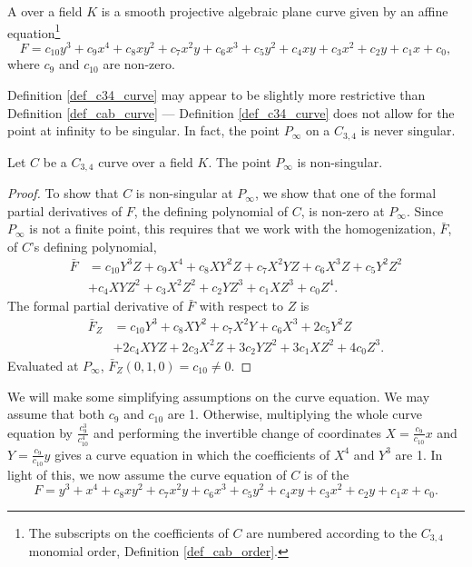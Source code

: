 \begin{definition}
  \label{def_c34_curve}
  A  over a field $K$
  is a smooth projective algebraic plane curve
  given by an affine equation\footnote{
  The subscripts on the coefficients of $C$ are numbered according to the $C_{3,4}$ monomial order,
  Definition \ref{def_cab_order}.}
  \[ F = c_{10}y^3 + c_9x^4 + c_8xy^2 + c_7x^2y + c_6x^3 + c_5y^2 + c_4xy + c_3x^2 + c_2y + c_1x + c_0, \]
  where $c_{9}$ and $c_{10}$ are non-zero.
\end{definition}

Definition \ref{def_c34_curve} may appear to be slightly more restrictive than Definition \ref{def_cab_curve} ---
Definition \ref{def_c34_curve} does not allow for the point at infinity to be singular.
In fact, the point $P_\infty$ on a $C_{3,4}$ is never singular.

\begin{proposition}
  Let $C$ be a $C_{3,4}$ curve over a field $K$.
  The point $P_\infty$ is non-singular.
\end{proposition}
\begin{proof}
  To show that $C$ is non-singular at $P_\infty$,
  we show that one of the formal partial derivatives of $F$,
  the defining polynomial of $C$, is non-zero at $P_\infty$.
  Since $P_\infty$ is not a finite point,
  this requires that we work with the homogenization, $\bar F$, of $C$'s defining polynomial,
  \begin{align*}
    \bar F &= c_{10}Y^3Z + c_9X^4 + c_8XY^2Z + c_7X^2YZ + c_6X^3Z + c_5Y^2Z^2 \\ 
           &+ c_4XYZ^2 + c_3X^2Z^2 + c_2YZ^3 + c_1XZ^3 + c_0Z^4.
  \end{align*}
  The formal partial derivative of $\bar F$ with respect to $Z$ is
  \begin{align*}
    \bar F_Z &= c_{10}Y^3 + c_8XY^2 + c_7X^2Y + c_6X^3 + 2c_5Y^2Z \\
             &+ 2c_4XYZ + 2c_3X^2Z + 3c_2YZ^2 + 3c_1XZ^2 + 4c_0Z^3.
  \end{align*}
  Evaluated at $P_\infty$, $\bar F_Z(0, 1, 0) = c_{10} \neq 0$.
\end{proof}

We will make some simplifying assumptions on the curve equation.
We may assume that both $c_9$ and $c_{10}$ are 1.
Otherwise, multiplying the whole curve equation by $\frac {c_9^3} {c_{10}^4}$
and performing the invertible change of coordinates
$X = \frac {c_9} {c_{10}} x$ and $Y = \frac {c_9} {c_{10}} y$
gives a curve equation in which the coefficients of $X^4$ and $Y^3$ are 1.
In light of this, we now assume the curve equation of $C$ is of the 
\begin{equation}
  \label{eq_c34}
  F = y^3 + x^4 + c_8xy^2 + c_7x^2y + c_6x^3 + c_5y^2 + c_4xy + c_3x^2 + c_2y + c_1x + c_0.
\end{equation}

